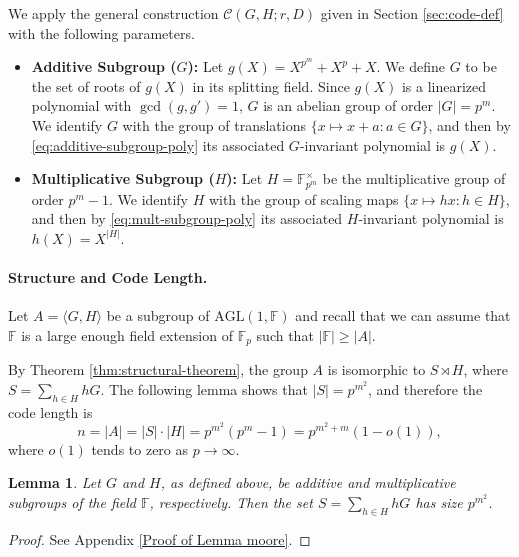 \documentclass[11pt]{article}
\theoremstyle{plain}
\newtheorem{lemma}[theorem]{Lemma}
\theoremstyle{definition}
\newcommand{\abs}[1]{\left|#1\right|}
\begin{document}
We apply the general construction $\mathcal{C}(G, H; r, D)$ given in Section \ref{sec:code-def} with the following parameters.


\begin{itemize}
    \item \textbf{Additive Subgroup ($G$):} Let $g(X) = X^{p^m} + X^p + X$. We define $G$ to be the set of roots of $g(X)$ in its splitting field. Since $g(X)$ is a linearized polynomial with $\gcd(g, g')=1$, $G$ is an abelian group of order $|G| = p^m$.
    We identify $G$ with the group of translations $\{x\mapsto x+a:a\in G\}$, and then by \eqref{eq:additive-subgroup-poly} its associated $G$-invariant polynomial is $g(X)$.
    \item \textbf{Multiplicative Subgroup ($H$):} Let $H = \mathbb{F}_{p^m}^\times$ be the  multiplicative group of order $p^m-1$. 
   We identify $H$ with the  group of scaling maps 
   $\{x\mapsto hx: h\in H\}$, and then by \eqref{eq:mult-subgroup-poly} its associated $H$-invariant polynomial is $h(X)=X^{\abs{H}}$.
\end{itemize}

\paragraph{Structure and Code Length.}
Let $A = \langle G, H \rangle$ be a subgroup of 
$\mathrm{AGL}(1,\mathbb{F})$ and recall that we can assume that  $\mathbb{F}$ is a large enough field extension of $\mathbb{F}_p$ such that  $\abs{\mathbb{F}}\geq \abs{A}.$

By Theorem \ref{thm:structural-theorem}, the group $A$ is isomorphic to $S \rtimes H$, where $S = \sum_{h\in H}hG$. The following lemma  shows that $\abs{S}=p^{m^2}$, and therefore the code length is
\[
    n = |A| = |S| \cdot |H| = p^{m^2}(p^m - 1)= p^{m^2+m}(1-o(1)),
\]
where $o(1)$ tends to zero as $p\rightarrow \infty.$

\begin{lemma}
\label{lem:moore}
Let $G$ and $H$, as defined above, be additive and multiplicative subgroups of the field $\mathbb{F}$, respectively. Then the set $S=\sum_{h\in H}hG$ has size $p^{m^2}$.
\end{lemma}
\begin{proof}
    See Appendix \ref{Proof of Lemma moore}.
\end{proof}
\end{document}
